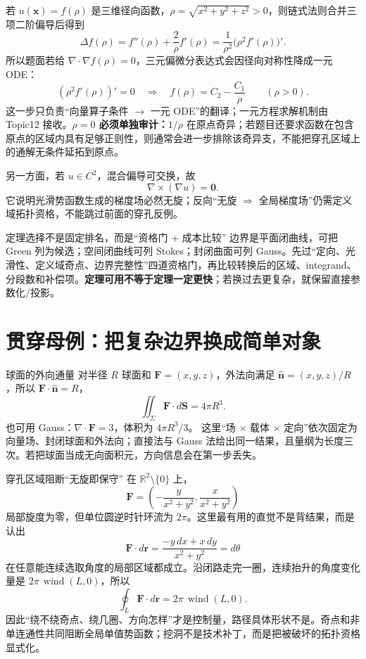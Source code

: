 \documentclass[11pt,a4paper,fontset=fandol]{ctexart}
\begin{document}
若 $u(\mathbf x)=f(\rho)$ 是三维径向函数，$\rho=\sqrt{x^2+y^2+z^2}>0$，则链式法则合并三项二阶偏导后得到
\[
\boxed{
\Delta f(\rho)=f''(\rho)+\frac{2}{\rho}f'(\rho)
=\frac1{\rho^2}\bigl(\rho^2f'(\rho)\bigr)'.}
\]
所以题面若给 $\nabla\cdot\nabla f(\rho)=0$，三元偏微分表达式会因径向对称性降成一元 ODE：
\[
(\rho^2f'(\rho))'=0
\quad\Longrightarrow\quad
f(\rho)=C_2-\frac{C_1}{\rho}
\qquad(\rho>0).
\]
这一步只负责“向量算子条件 $\to$ 一元 ODE”的翻译；一元方程求解机制由 Topic12 接收。\textbf{$\rho=0$ 必须单独审计：}$1/\rho$ 在原点奇异；若题目还要求函数在包含原点的区域内具有足够正则性，则通常会进一步排除该奇异支，不能把穿孔区域上的通解无条件延拓到原点。

另一方面，若 $u\in C^2$，混合偏导可交换，故
\[
\boxed{\nabla\times(\nabla u)=\mathbf0.}
\]
它说明光滑势函数生成的梯度场必然无旋；反向“无旋 $\Rightarrow$ 全局梯度场”仍需定义域拓扑资格，不能跳过前面的穿孔反例。

\begin{methodbox}{定理选择不是固定排名，而是“资格门 + 成本比较”}
边界是平面闭曲线，可把 Green 列为候选；空间闭曲线可列 Stokes；封闭曲面可列 Gauss。先过“定向、光滑性、定义域奇点、边界完整性”四道资格门，再比较转换后的区域、integrand、分段数和补偿项。\textbf{定理可用不等于定理一定更快}；若换过去更复杂，就保留直接参数化/投影。
\end{methodbox}

\section{贯穿母例：把复杂边界换成简单对象}

\begin{examplebox}{球面的外向通量}
对半径 $R$ 球面和 $\mathbf F=(x,y,z)$，外法向满足 $\widehat{\mathbf n}=(x,y,z)/R$，所以 $\mathbf F\cdot\widehat{\mathbf n}=R$，
\[
\iint_\Sigma\mathbf F\cdot d\mathbf S=4\pi R^3.
\]
也可用 Gauss：$\nabla\cdot\mathbf F=3$，体积为 $4\pi R^3/3$。
这里“场 $\times$ 载体 $\times$ 定向”依次固定为向量场、封闭球面和外法向；直接法与 Gauss 法给出同一结果，且量纲为长度三次。若把球面当成无向面积元，方向信息会在第一步丢失。
\end{examplebox}

\begin{examplebox}{穿孔区域阻断“无旋即保守”}
在 $\mathbb R^2\setminus\{0\}$ 上，
\[
\mathbf F=\left(-\frac y{x^2+y^2},\frac x{x^2+y^2}\right)
\]
局部旋度为零，但单位圆逆时针环流为 $2\pi$。这里最有用的直觉不是背结果，而是认出
\[
\mathbf F\cdot d\mathbf r
=\frac{-y\,dx+x\,dy}{x^2+y^2}=d\theta
\]
在任意能连续选取角度的局部区域都成立。沿闭路走完一圈，连续抬升的角度变化量是 $2\pi\,\operatorname{wind}(L,0)$，所以
\[
\boxed{\oint_L\mathbf F\cdot d\mathbf r=2\pi\,\operatorname{wind}(L,0).}
\]
因此“绕不绕奇点、绕几圈、方向怎样”才是控制量，路径具体形状不是。奇点和非单连通性共同阻断全局单值势函数；挖洞不是技术补丁，而是把被破坏的拓扑资格显式化。
\end{examplebox}
\end{document}
